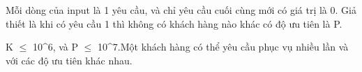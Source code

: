 Mỗi dòng của input là 1 yêu cầu, và chỉ yêu cầu cuối cùng mới có giá trị là 0. Giả thiết là khi có yêu cầu 1 thì không có khách hàng nào khác có độ ưu tiên là P.  

   K $\le$ 10^6, và P $\le$  10^7.Một khách hàng có thể yêu cầu phục vụ nhiều lần và với các độ ưu tiên khác nhau.